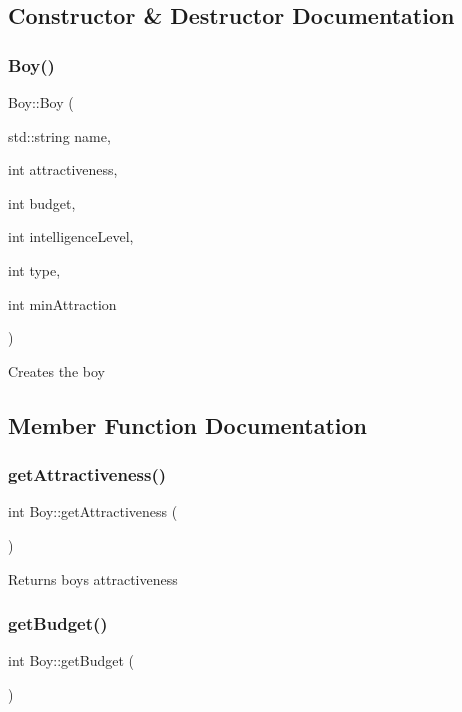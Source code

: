 \subsection{Constructor \& Destructor Documentation}
\mbox{\label{class_boy_a0a51d40be8680589d7ed43a64959fc8b}} 
\subsubsection{\texorpdfstring{Boy()}{Boy()}}
{\footnotesize\ttfamily Boy\+::\+Boy (\begin{DoxyParamCaption}\item[{std\+::string}]{name,  }\item[{int}]{attractiveness,  }\item[{int}]{budget,  }\item[{int}]{intelligence\+Level,  }\item[{int}]{type,  }\item[{int}]{min\+Attraction }\end{DoxyParamCaption})}

Creates the boy 

\subsection{Member Function Documentation}
\mbox{\label{class_boy_a814ef4919f2ac86c6ee70f9698afad3d}} 
\subsubsection{\texorpdfstring{get\+Attractiveness()}{getAttractiveness()}}
{\footnotesize\ttfamily int Boy\+::get\+Attractiveness (\begin{DoxyParamCaption}{ }\end{DoxyParamCaption})}

Returns boy\textquotesingle{}s attractiveness \mbox{\label{class_boy_a05c48b12091ebcad44ba86ba88514ac5}} 
\subsubsection{\texorpdfstring{get\+Budget()}{getBudget()}}
{\footnotesize\ttfamily int Boy\+::get\+Budget (\begin{DoxyParamCaption}{ }\end{DoxyParamCaption})}

